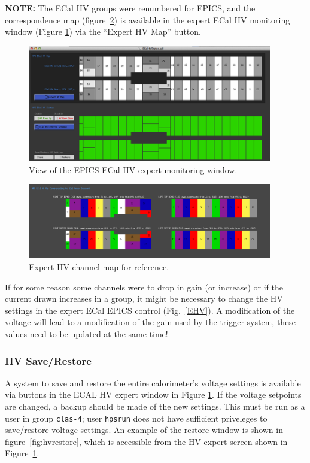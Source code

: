 \documentclass[12pt]{article}
\begin{document}
{ {\bf NOTE:} The ECal HV groups were renumbered for EPICS, and the correspondence map (figure~\ref{ExpertMap}) is available in the expert ECal HV monitoring window (Figure 
 \ref{HV}) via the ``Expert HV Map'' button.

\begin{figure}[htbp]
\center
\includegraphics[width=0.95\textwidth]{pics/ecalhvmongui.png}
\caption{ \label{HV} View of the EPICS ECal HV expert monitoring window.}
\end{figure}

\begin{figure}[htbp]
\center
\includegraphics[width=0.95\textwidth]{pics/ecalhv_expertmap_2014_12_15.png}
\caption{ \label{ExpertMap} Expert HV channel map for reference.}
\end{figure}

      If for some reason some channels were to drop in gain (or increase) or if the current drawn increases in a group, it might be necessary to change the HV settings in the expert ECal EPICS control (Fig.~\ref{EHV}). A modification of the voltage will lead to a modification of the gain used by the trigger system, these values need to be updated at the same time!
    
      \subsubsection{HV Save/Restore}
      A system to save and restore the entire calorimeter's voltage settings is available via buttons in the ECAL HV expert window in Figure \ref{HV}.  If the voltage setpoints are changed, a backup should be made of the new settings.  This must be run as a user in group \texttt{clas-4};  user \texttt{hpsrun} does not have sufficient priveleges to save/restore voltage settings. 
      An example of the restore window is shown in figure~\ref{fig:hvrestore}, which is accessible from the HV expert screen shown in Figure~\ref{HV}.

}
\end{document}

